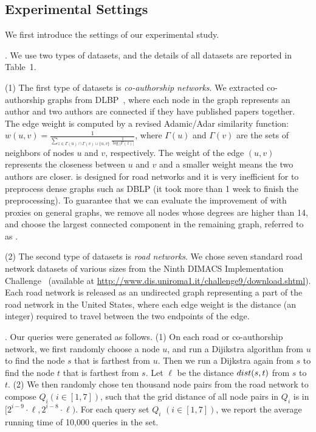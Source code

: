 




\subsection{Experimental Settings}
We first introduce the settings of our experimental study.







.
We use two types of datasets, and the details of all datasets are reported in Table~1.



\sstab (1) The first type of datasets is {\em co-authorship networks}. We extracted co-authorship graphs from DLBP~\cite{snapnets}, where each node in the graph represents an author and two authors are connected if they have published papers together. The edge weight is computed by a revised Adamic/Adar similarity function: $w(u,v) = \frac{1}{\sum_{z\in {\Gamma(u)\cap \Gamma(v) \cup \{u,v\}}}\frac{1}{\log{|\Gamma(z)|}}}$, where $\Gamma(u)$ and $\Gamma(v)$ are the sets of neighbors of nodes $u$ and $v$, respectively. The weight of the edge $(u,v)$ represents the closeness between $u$ and $v$ and a smaller weight means the two authors are closer. \tnr is designed for road networks and it is very inefficient for \tnr to preprocess dense graphs such as DBLP (it took more than 1 week to finish the preprocessing). To guarantee that we can evaluate the improvement of \tnr with proxies on general graphs, we remove all nodes whose degrees are higher than 14, and choose the largest connected component in the remaining graph, referred to as \dblpone.


\sstab (2) The second type of datasets is {\em road networks}. We chose seven standard road network datasets of various sizes from the Ninth DIMACS
Implementation Challenge~\cite{dimacs-datasets} (available at {\url{http://www.dis.uniroma1.it/challenge9/download.shtml}}). Each road network is released as an undirected graph representing a part of the road network in the United States, where each edge weight is the distance (an integer) required to travel between the two endpoints of the edge.


. Our queries were generated as follows.
(1) On each road  or co-authorship network, we first randomly choose a node $u$, and run a Dijikstra algorithm from $u$ to find the node $s$ that is farthest from $u$. Then we run a Dijkstra again from $s$ to find the node $t$ that is farthest from $s$. Let $\ell$ be the distance $\dist(s,t)$ from $s$ to $t$.
(2) We then randomly chose ten thousand node pairs from
the road network to compose $Q_i (i \in [1,7])$, such that the grid
distance of all node pairs in $Q_i$ is in $[2^{i-9}\cdot\ell, 2^{i-8}\cdot\ell)$.
For each query set $Q_i$ $(i\in [1,7])$, we report the average running time of 10,000 queries in the set.

